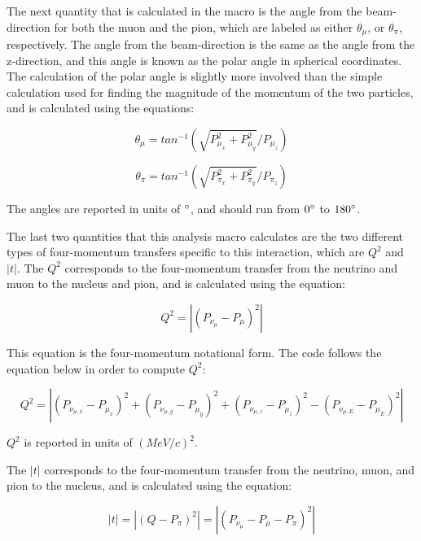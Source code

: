 \documentclass[11pt]{article}
\begin{document}
The next quantity that is calculated in the macro is the angle from the beam-direction for both the muon and the pion, which are labeled as either $\theta_\mu$, or $\theta_\pi$, respectively. The angle from the beam-direction is the same as the angle from the z-direction, and this angle is known as the polar angle in spherical coordinates. The calculation of the polar angle is slightly more involved than the simple calculation used for finding the magnitude of the momentum of the two particles, and is calculated using the equations:

\begin{equation}
\theta_\mu = tan^{-1}(\sqrt{P_{\mu_x}^2 + P_{\mu_y}^2}/{P_{\mu_z}})
\end{equation}

\begin{equation}
\theta_\pi = tan^{-1}(\sqrt{P_{\pi_x}^2 + P_{\pi_y}^2}/{P_{\pi_z}})
\end{equation}

\noindent
The angles are reported in units of $\degree$, and should run from $0\degree$ to $180\degree$.

The last two quantities that this analysis macro calculates are the two different types of four-momentum transfers specific to this interaction, which are $Q^2$ and $|t|$. The $Q^2$ corresponds to the four-momentum transfer from the neutrino and muon to the nucleus and pion, and is calculated using the equation:

\begin{equation}
Q^2 = |(P_{\nu_\mu} - P_\mu)^2|
\end{equation}

\noindent
This equation is the four-momentum notational form. The code follows the equation below in order to compute $Q^2$:

\begin{equation}
Q^2 = |(P_{\nu_{\mu,x}} - P_{\mu_x})^2 + (P_{\nu_{\mu,y}} - P_{\mu_y})^2 + (P_{\nu_{\mu,z}} - P_{\mu_z})^2 - (P_{\nu_{\mu,E}} - P_{\mu_E})^2|
\end{equation}

\noindent
$Q^2$ is reported in units of $(MeV/c)^2$.

The $|t|$ corresponds to the four-momentum transfer from the neutrino, muon, and pion to the nucleus, and is calculated using the equation:

\begin{equation}
|t| = |(Q - P_\pi)^2| = |(P_{\nu_\mu} - P_\mu - P_\pi)^2|
\end{equation}
\end{document}
